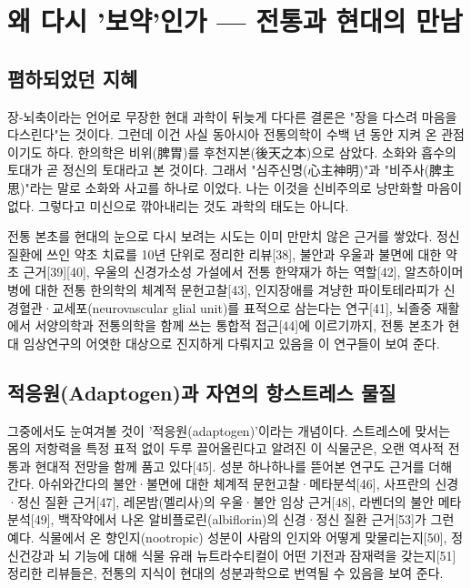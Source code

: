 \documentclass[12pt,oneside]{book}
\begin{document}
\section{왜 다시 '보약'인가 — 전통과 현대의 만남}

\subsection{폄하되었던 지혜}

장-뇌축이라는 언어로 무장한 현대 과학이 뒤늦게 다다른 결론은 "장을 다스려 마음을 다스린다"는 것이다. 그런데 이건 사실 동아시아 전통의학이 수백 년 동안 지켜 온 관점이기도 하다. 한의학은 비위(脾胃)를 후천지본(後天之本)으로 삼았다. 소화와 흡수의 토대가 곧 정신의 토대라고 본 것이다. 그래서 "심주신명(心主神明)"과 "비주사(脾主思)"라는 말로 소화와 사고를 하나로 이었다. 나는 이것을 신비주의로 낭만화할 마음이 없다. 그렇다고 미신으로 깎아내리는 것도 과학의 태도는 아니다.

전통 본초를 현대의 눈으로 다시 보려는 시도는 이미 만만치 않은 근거를 쌓았다. 정신질환에 쓰인 약초 치료를 10년 단위로 정리한 리뷰[38], 불안과 우울과 불면에 대한 약초 근거[39][40], 우울의 신경가소성 가설에서 전통 한약재가 하는 역할[42], 알츠하이머병에 대한 전통 한의학의 체계적 문헌고찰[43], 인지장애를 겨냥한 파이토테라피가 신경혈관·교세포(neurovascular glial unit)를 표적으로 삼는다는 연구[41], 뇌졸중 재활에서 서양의학과 전통의학을 함께 쓰는 통합적 접근[44]에 이르기까지, 전통 본초가 현대 임상연구의 어엿한 대상으로 진지하게 다뤄지고 있음을 이 연구들이 보여 준다.

\subsection{적응원(Adaptogen)과 자연의 항스트레스 물질}

그중에서도 눈여겨볼 것이 '적응원(adaptogen)'이라는 개념이다. 스트레스에 맞서는 몸의 저항력을 특정 표적 없이 두루 끌어올린다고 알려진 이 식물군은, 오랜 역사적 전통과 현대적 전망을 함께 품고 있다[45]. 성분 하나하나를 뜯어본 연구도 근거를 더해 간다. 아쉬와간다의 불안·불면에 대한 체계적 문헌고찰·메타분석[46], 사프란의 신경·정신 질환 근거[47], 레몬밤(멜리사)의 우울·불안 임상 근거[48], 라벤더의 불안 메타분석[49], 백작약에서 나온 알비플로린(albiflorin)의 신경·정신 질환 근거[53]가 그런 예다. 식물에서 온 향인지(nootropic) 성분이 사람의 인지와 어떻게 맞물리는지[50], 정신건강과 뇌 기능에 대해 식물 유래 뉴트라수티컬이 어떤 기전과 잠재력을 갖는지[51] 정리한 리뷰들은, 전통의 지식이 현대의 성분과학으로 번역될 수 있음을 보여 준다.
\end{document}
